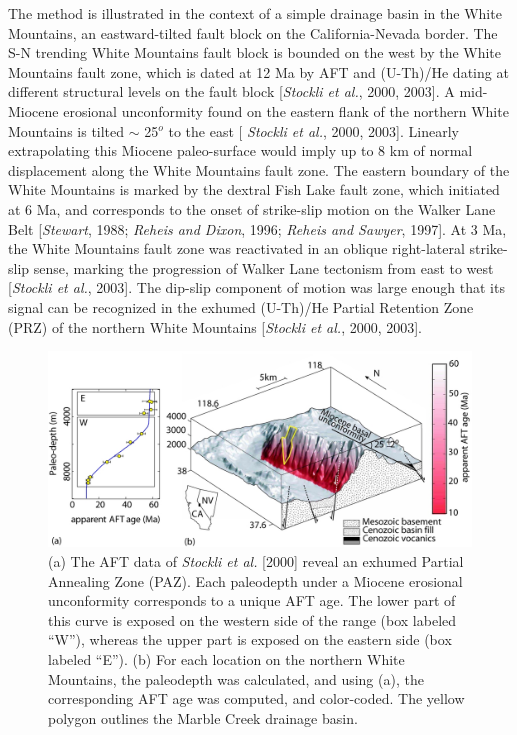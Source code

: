 \documentclass[12pt,twoside]{article}
\begin{document}
The method is illustrated in the context of a simple drainage basin in
the   White  Mountains,   an  eastward-tilted   fault  block   on  the
California-Nevada  border.   The S-N  trending  White Mountains  fault
block is bounded on the west  by the White Mountains fault zone, which
is dated at 12 Ma by  AFT and (U-Th)/He dating at different structural
levels  on the  fault block  [{\it Stockli  et al.},  2000,  2003].  A
mid-Miocene erosional  unconformity found on the eastern  flank of the
northern White  Mountains is  tilted $\sim$ 25$^o$  to the  east [{\it
  Stockli et  al.}, 2000, 2003].  Linearly  extrapolating this Miocene
paleo-surface would imply up to  8 km of normal displacement along the
White  Mountains  fault  zone.   The  eastern boundary  of  the  White
Mountains  is  marked by  the  dextral  Fish  Lake fault  zone,  which
initiated at 6 Ma, and  corresponds to the onset of strike-slip motion
on the Walker Lane Belt  [{\it Stewart}, 1988; {\it Reheis and Dixon},
1996; {\it  Reheis and Sawyer}, 1997].   At 3 Ma,  the White Mountains
fault  zone was  reactivated in  an oblique  right-lateral strike-slip
sense, marking the  progression of Walker Lane tectonism  from east to
west [{\it Stockli  et al.}, 2003].  The dip-slip  component of motion
was  large enough that  its signal  can be  recognized in  the exhumed
(U-Th)/He Partial Retention Zone (PRZ) of the northern White Mountains
[{\it Stockli et al.}, 2000, 2003].
\\

\begin{figure}[here]
  \centering
  \includegraphics[width=\textwidth]{fig1.jpg}
  \caption[Predicted AFT cooling ages of the northern White Mountains]
  { (a) The AFT data of {\it Stockli et al.}  [2000] reveal an exhumed
    Partial  Annealing Zone  (PAZ).  Each  paleodepth under  a Miocene
    erosional unconformity corresponds to  a unique AFT age. The lower
    part of  this curve is  exposed on the  western side of  the range
    (box  labeled ``W''),  whereas the  upper part  is exposed  on the
    eastern side  (box labeled  ``E''). (b) For  each location  on the
    northern White Mountains, the paleodepth was calculated, and using
    (a), the corresponding AFT age was computed, and color-coded.  The
    yellow polygon outlines the Marble Creek drainage basin.}
\label{fig:whitePAZ}
\end{figure}
\end{document}
